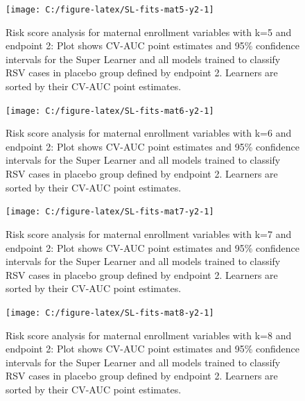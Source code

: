 \documentclass[11pt]{article}
\begin{document}
\begin{figure}[H]

{\centering \texttt{[image: C:/figure-latex/SL-fits-mat5-y2-1]} 

}

\caption[Risk score analysis for maternal enrollment variables with k=5 and endpoint 2.]{Risk score analysis for maternal enrollment variables with k=5 and endpoint 2: Plot shows CV-AUC point estimates and 95\% confidence intervals for the Super Learner and all models trained to classify RSV cases in placebo group defined by endpoint 2. Learners are sorted by their CV-AUC point estimates.}\label{fig:SL-fits-mat5-y2}
\end{figure}

\begin{figure}[H]

{\centering \texttt{[image: C:/figure-latex/SL-fits-mat6-y2-1]} 

}

\caption[Risk score analysis for maternal enrollment variables with k=6 and endpoint 2.]{Risk score analysis for maternal enrollment variables with k=6 and endpoint 2: Plot shows CV-AUC point estimates and 95\% confidence intervals for the Super Learner and all models trained to classify RSV cases in placebo group defined by endpoint 2. Learners are sorted by their CV-AUC point estimates.}\label{fig:SL-fits-mat6-y2}
\end{figure}

\begin{figure}[H]

{\centering \texttt{[image: C:/figure-latex/SL-fits-mat7-y2-1]} 

}

\caption[Risk score analysis for maternal enrollment variables with k=7 and endpoint 2.]{Risk score analysis for maternal enrollment variables with k=7 and endpoint 2: Plot shows CV-AUC point estimates and 95\% confidence intervals for the Super Learner and all models trained to classify RSV cases in placebo group defined by endpoint 2. Learners are sorted by their CV-AUC point estimates.}\label{fig:SL-fits-mat7-y2}
\end{figure}

\begin{figure}[H]

{\centering \texttt{[image: C:/figure-latex/SL-fits-mat8-y2-1]} 

}

\caption[Risk score analysis for maternal enrollment variables with k=8 and endpoint 2.]{Risk score analysis for maternal enrollment variables with k=8 and endpoint 2: Plot shows CV-AUC point estimates and 95\% confidence intervals for the Super Learner and all models trained to classify RSV cases in placebo group defined by endpoint 2. Learners are sorted by their CV-AUC point estimates.}\label{fig:SL-fits-mat8-y2}
\end{figure}
\end{document}
